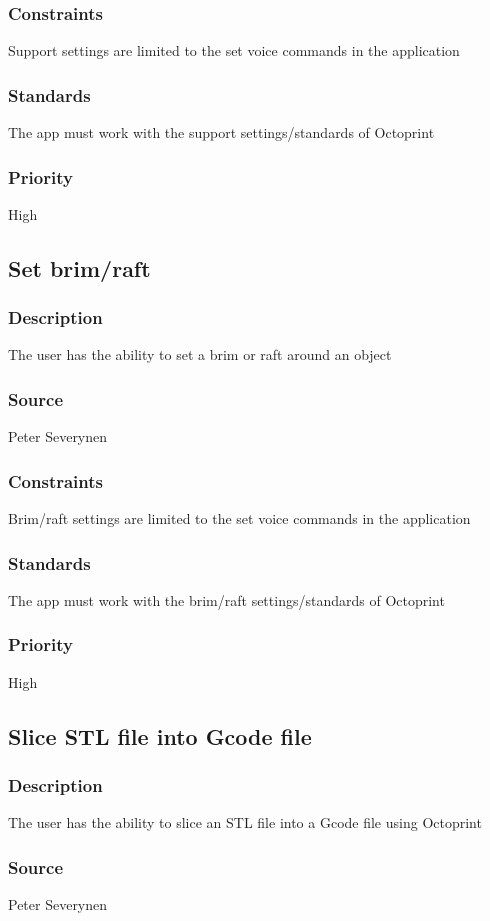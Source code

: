 \subsubsection{Constraints}
Support settings are limited to the set voice commands in the application
\subsubsection{Standards}
The app must work with the support settings/standards of Octoprint
\subsubsection{Priority}
High
\subsection{Set brim/raft}
\subsubsection{Description}
The user has the ability to set a brim or raft around an object
\subsubsection{Source}
Peter Severynen
\subsubsection{Constraints}
Brim/raft settings are limited to the set voice commands in the application
\subsubsection{Standards}
The app must work with the brim/raft settings/standards of Octoprint
\subsubsection{Priority}
High
\subsection{Slice STL file into Gcode file}
\subsubsection{Description}
The user has the ability to slice an STL file into a Gcode file using Octoprint
\subsubsection{Source}
Peter Severynen
